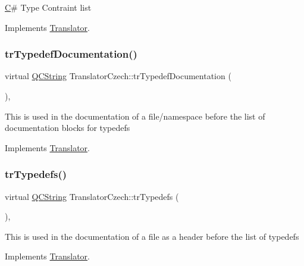 \mbox{\hyperlink{class_c}{C}}\# Type Contraint list 

Implements \mbox{\hyperlink{class_translator}{Translator}}.

\mbox{\label{class_translator_czech_a53bff586f81d843762850f1b4a827587}} 
\subsubsection{\texorpdfstring{trTypedefDocumentation()}{trTypedefDocumentation()}}
{\footnotesize\ttfamily virtual \mbox{\hyperlink{class_q_c_string}{Q\+C\+String}} Translator\+Czech\+::tr\+Typedef\+Documentation (\begin{DoxyParamCaption}{ }\end{DoxyParamCaption})\hspace{0.3cm}{\ttfamily [inline]}, {\ttfamily [virtual]}}

This is used in the documentation of a file/namespace before the list of documentation blocks for typedefs 

Implements \mbox{\hyperlink{class_translator}{Translator}}.

\mbox{\label{class_translator_czech_a8c129e4c105bccc4e95f1c0584effe66}} 
\subsubsection{\texorpdfstring{trTypedefs()}{trTypedefs()}}
{\footnotesize\ttfamily virtual \mbox{\hyperlink{class_q_c_string}{Q\+C\+String}} Translator\+Czech\+::tr\+Typedefs (\begin{DoxyParamCaption}{ }\end{DoxyParamCaption})\hspace{0.3cm}{\ttfamily [inline]}, {\ttfamily [virtual]}}

This is used in the documentation of a file as a header before the list of typedefs 

Implements \mbox{\hyperlink{class_translator}{Translator}}.

\mbox{\label{class_translator_czech_ac13a6ba14a9905698227dafadc76636e}} 
